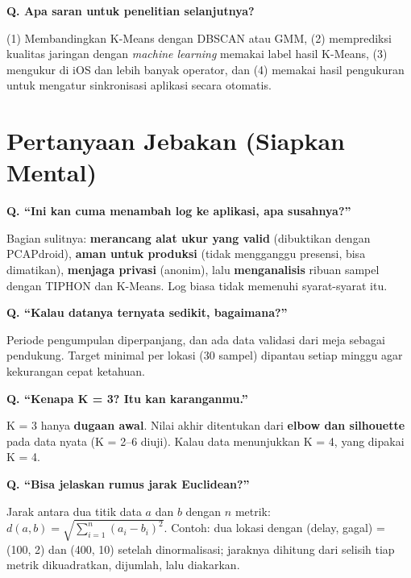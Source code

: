 \documentclass[11pt,a4paper]{article}
\newcounter{q}
\newcommand{\tanya}[2]{\stepcounter{q}%
\par\vspace{6pt}\noindent\colorbox{band}{\parbox{\dimexpr\linewidth-2\fboxsep}{\textbf{Q\arabic{q}. #1}}}\par\vspace{2pt}#2\par}
\begin{document}
\tanya{Apa saran untuk penelitian selanjutnya?}{(1) Membandingkan K-Means dengan DBSCAN atau GMM, (2) memprediksi kualitas jaringan dengan \textit{machine learning} memakai label hasil K-Means, (3) mengukur di iOS dan lebih banyak operator, dan (4) memakai hasil pengukuran untuk mengatur sinkronisasi aplikasi secara otomatis.}

\section{Pertanyaan Jebakan (Siapkan Mental)}

\tanya{``Ini kan cuma menambah log ke aplikasi, apa susahnya?''}{Bagian sulitnya: \textbf{merancang alat ukur yang valid} (dibuktikan dengan PCAPdroid), \textbf{aman untuk produksi} (tidak mengganggu presensi, bisa dimatikan), \textbf{menjaga privasi} (anonim), lalu \textbf{menganalisis} ribuan sampel dengan TIPHON dan K-Means. Log biasa tidak memenuhi syarat-syarat itu.}

\tanya{``Kalau datanya ternyata sedikit, bagaimana?''}{Periode pengumpulan diperpanjang, dan ada data validasi dari meja sebagai pendukung. Target minimal per lokasi (30 sampel) dipantau setiap minggu agar kekurangan cepat ketahuan.}

\tanya{``Kenapa K = 3? Itu kan karanganmu.''}{K = 3 hanya \textbf{dugaan awal}. Nilai akhir ditentukan dari \textbf{elbow dan silhouette} pada data nyata (K = 2--6 diuji). Kalau data menunjukkan K = 4, yang dipakai K = 4.}

\tanya{``Bisa jelaskan rumus jarak Euclidean?''}{Jarak antara dua titik data $a$ dan $b$ dengan $n$ metrik: $d(a,b) = \sqrt{\sum_{i=1}^{n}(a_i - b_i)^2}$. Contoh: dua lokasi dengan (delay, gagal) = (100, 2) dan (400, 10) setelah dinormalisasi; jaraknya dihitung dari selisih tiap metrik dikuadratkan, dijumlah, lalu diakarkan.}
\end{document}
